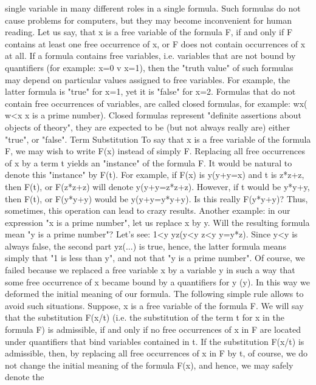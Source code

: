 single variable in many different roles in a single formula. Such formulas do not cause problems for
computers, but they may become inconvenient for human reading.
Let us say, that x is a free variable of the formula F, if and only if F contains at least one free occurrence
of x, or F does not contain occurrences of x at all.
If a formula contains free variables, i.e. variables that are not bound by quantifiers (for example: x=0 v
x=1), then the "truth value" of such formulas may depend on particular values assigned to free variables.
For example, the latter formula is "true" for x=1, yet it is "false" for x=2. Formulas that do not contain
free occurrences of variables, are called closed formulas, for example:
\forall w\exists x( w<x \AND  x is a prime number).
Closed formulas represent "definite assertions about objects of theory", they are expected to be (but not
always really are) either "true", or "false".
Term Substitution
To say that x is a free variable of the formula F, we may wish to write F(x) instead of simply F. Replacing
all free occurrences of x by a term t yields an "instance" of the formula F. It would be natural to denote
this "instance" by F(t).
For example, if F(x) is \exists y(y+y=x) and t is z*z+z, then F(t), or F(z*z+z) will denote \exists y(y+y=z*z+z).
However, if t would be y*y+y, then F(t), or F(y*y+y) would be \exists y(y+y=y*y+y). Is this really F(y*y+y)?
Thus, sometimes, this operation can lead to crazy results. Another example: in our expression "x is a
prime number", let us replace x by y. Will the resulting formula mean "y is a prime number"? Let's see:
1<y \AND  \neg \exists y\exists z(y<y \AND  z<y \AND  y=y*z).
Since y<y is always false, the second part \neg \exists y\exists z(...) is true, hence, the latter formula means simply that
"1 is less than y", and not that "y is a prime number".
Of course, we failed because we replaced a free variable x by a variable y in such a way that some free
occurrence of x became bound by a quantifiers for y (\exists y). In this way we deformed the initial meaning
of our formula.
The following simple rule allows to avoid such situations. Suppose, x is a free variable of the formula F.
We will say that the substitution F(x/t) (i.e. the substitution of the term t for x in the formula F) is
admissible, if and only if no free occurrences of x in F are located under quantifiers that bind variables
contained in t. If the substitution F(x/t) is admissible, then, by replacing all free occurrences of x in F by t,
of course, we do not change the initial meaning of the formula F(x), and hence, we may safely denote the
